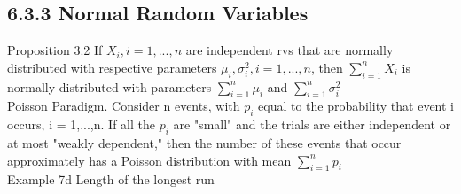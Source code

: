 \documentclass{article}
\begin{document}
\subsection*{6.3.3 Normal Random Variables}
Proposition 3.2 If $X_i, i = 1, ..., n$ are independent rvs that are normally distributed with respective parameters $\mu_i, \sigma_i^2, i = 1, ..., n$, then $\sum_{i=1}^n X_i$ is normally distributed with parameters $\sum_{i=1}^n \mu_i$ and $\sum_{i=1}^n \sigma_i^2$
\\
Poisson Paradigm. Consider n events, with $p_i$ equal to the probability that event i occurs, i = 1,...,n. If all the $p_i$ are "small" and the trials are either independent or at most "weakly dependent," then the number of these events that occur approximately has a Poisson distribution with mean $\sum_{i=1}^n p_i$\\
Example 7d Length of the longest run \\



\end{document}
